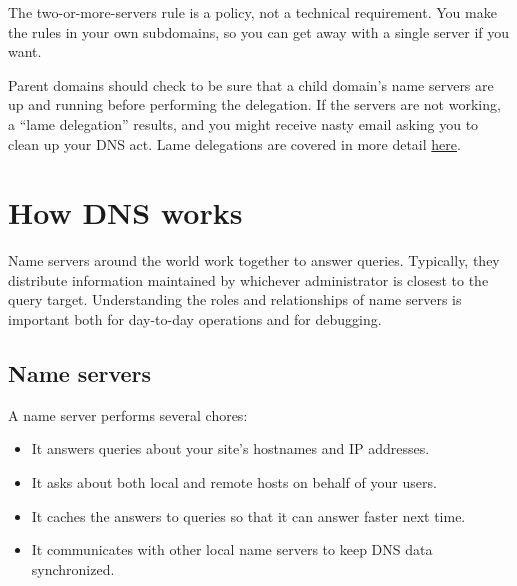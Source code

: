 The two-or-more-servers rule is a policy, not a technical requirement.
You make the rules in your own subdomains, so you can get away with a
single server if you want.

Parent domains should check to be sure that a child domain's name
servers are up and running before performing the delegation. If the
servers are not working, a ``lame delegation'' results, and you might
receive nasty email asking you to clean up your DNS act. Lame
delegations are covered in more detail
\protect\hyperlink{part0024_split_072.htmlux5cux23_idTextAnchor966}{here}.




\section{How DNS works}

Name servers around the world work together to answer queries.
Typically, they distribute information maintained by whichever
administrator is closest to the {query} target. Understanding the roles
and relationships of name servers is important both for day-to-day
operations and for debugging.

\protect\hypertarget{part0024_split_011.html}{}{}

\hypertarget{part0024_split_011.htmlux5cux23_idContainer1069}{}
\hypertarget{part0024_split_011.htmlux5cux23calibre_pb_10}{%
\subsection[Name
servers]{\texorpdfstring{\protect\hypertarget{part0024_split_011.htmlux5cux23_idTextAnchor854}{}{}Name
servers}{Name servers}}\label{part0024_split_011.htmlux5cux23calibre_pb_10}}

\protect\hypertarget{part0024_split_011.htmlux5cux23_idIndexMarker2012}{}{}A
name server performs several chores:

\begin{itemize}
\tightlist
\item
  It answers queries about your site's hostnames and IP addresses.
\item
  It asks about both local and remote hosts on behalf of your users.
\item
  It caches the answers to queries so that it can answer faster next
  time.
\item
  It communicates with other local name servers to keep DNS data
  synchronized.
\end{itemize}

